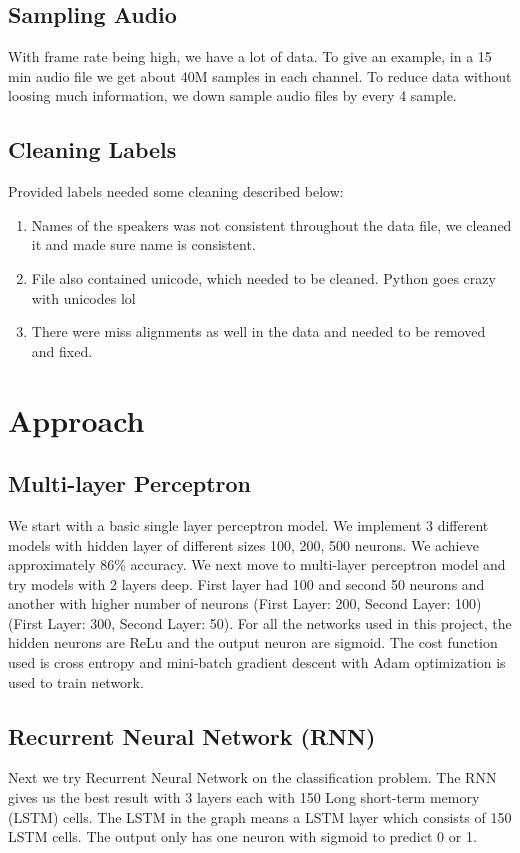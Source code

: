 \documentclass[a4paper]{article}
\begin{document}
\subsection{Sampling Audio}
With frame rate being high, we have a lot of data. To give an example, in a 15 min audio file we get about 40M samples in each channel.  To reduce data without loosing much information, we down sample audio files by every 4 sample. \cite{giannakopoulos2015pyaudioanalysis}

\subsection{Cleaning Labels}
Provided labels needed some cleaning described below:
\begin{enumerate}
\item Names of the speakers was not consistent throughout the data file, we cleaned it and made sure name is consistent.
\item File also contained unicode, which needed to be cleaned. Python goes crazy with unicodes lol
\item There were miss alignments as well in the data and needed to be removed and fixed.
\end{enumerate}	

\section{Approach}

\subsection{Multi-layer Perceptron}
We start with a basic single layer perceptron model. We implement 3 different models with hidden layer of different sizes 100, 200, 500 neurons. We achieve approximately 86\% accuracy. 
We next move to multi-layer perceptron model and try models with 2 layers deep. First layer had 100 and second 50 neurons and another with higher number of neurons (First Layer: 200, Second Layer: 100) (First Layer: 300, Second Layer: 50). For all the networks used in this project, the hidden neurons are ReLu \cite{relu} and the output neuron are sigmoid. The cost function used is cross entropy and mini-batch gradient descent with Adam optimization is used to train network.

\subsection{Recurrent Neural Network (RNN)}
Next we try Recurrent Neural Network \cite{mikolov2010recurrent} on the classification problem. The RNN gives us the best result with 3 layers each with 150 Long short-term memory (LSTM) cells. The LSTM in the graph means a LSTM layer which consists of 150 LSTM cells. The output only has one neuron with sigmoid to predict 0 or 1. 
\end{document}
